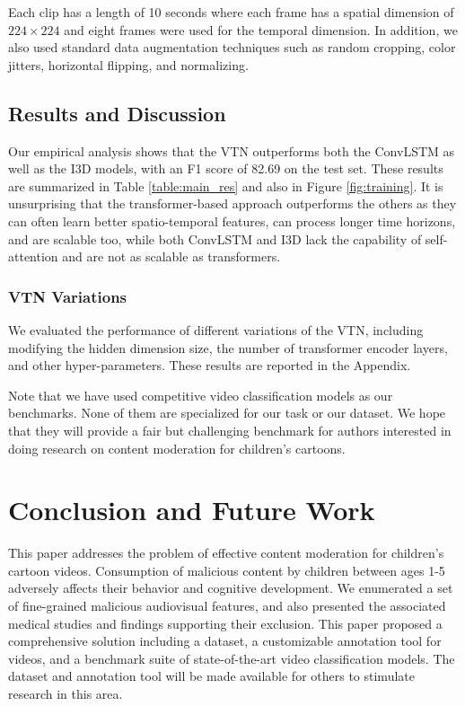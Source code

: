 \documentclass[letterpaper]{article}
\begin{document}
Each clip has a length of 10 seconds where each frame has a spatial dimension of $224 \times 224$ and eight frames were used for the temporal dimension. In addition, we also used standard data augmentation techniques such as random cropping, color jitters, horizontal flipping, and normalizing.   

\subsection{Results and Discussion}

Our empirical analysis shows that the VTN outperforms both the ConvLSTM as well as the I3D models, with an F1 score of 82.69 on the test set. These results are summarized in Table \ref{table:main_res} and also in Figure \ref{fig:training}. It is unsurprising that the transformer-based approach outperforms the others as they can often learn better spatio-temporal features, can process longer time horizons, and are scalable too, while both ConvLSTM and I3D lack the capability of self-attention and are not as scalable as transformers.  

\subsubsection{VTN Variations}
We evaluated the performance of different variations of the VTN, including modifying the hidden dimension size, the number of transformer encoder layers, and other hyper-parameters. These results are reported in the Appendix.

Note that we have used competitive video classification models as our benchmarks.  None of them are specialized for our task or our dataset.  We hope that they will provide a fair but challenging benchmark for authors interested in doing research on content moderation for children's cartoons. 


\section{Conclusion and Future Work}
This paper addresses the problem of effective content moderation for children's cartoon videos. 
 Consumption of malicious content by children between ages 1-5 adversely affects their behavior and cognitive development. We enumerated a set of fine-grained malicious audiovisual features, and also presented the associated medical studies and findings supporting their exclusion. This paper proposed a comprehensive solution including a dataset, a customizable annotation tool for videos, and a benchmark suite of state-of-the-art video classification models. The dataset and annotation tool will be made available for others to stimulate research in this area.
 
\end{document}
